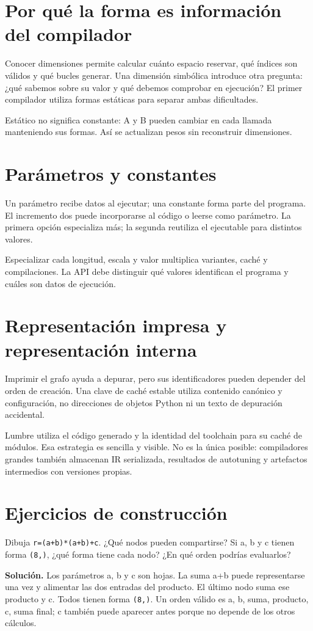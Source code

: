 \documentclass[12pt,a4paper,oneside]{report}
\begin{document}
\section{Por qué la forma es información del compilador}
Conocer dimensiones permite calcular cuánto espacio reservar, qué índices son válidos y qué bucles generar. Una dimensión simbólica introduce otra pregunta: ¿qué sabemos sobre su valor y qué debemos comprobar en ejecución? El primer compilador utiliza formas estáticas para separar ambas dificultades.

Estático no significa constante: A y B pueden cambiar en cada llamada manteniendo sus formas. Así se actualizan pesos sin reconstruir dimensiones.

\section{Parámetros y constantes}
Un parámetro recibe datos al ejecutar; una constante forma parte del programa. El incremento dos puede incorporarse al código o leerse como parámetro. La primera opción especializa más; la segunda reutiliza el ejecutable para distintos valores.

Especializar cada longitud, escala y valor multiplica variantes, caché y compilaciones. La API debe distinguir qué valores identifican el programa y cuáles son datos de ejecución.

\section{Representación impresa y representación interna}
Imprimir el grafo ayuda a depurar, pero sus identificadores pueden depender del orden de creación. Una clave de caché estable utiliza contenido canónico y configuración, no direcciones de objetos Python ni un texto de depuración accidental.

Lumbre utiliza el código generado y la identidad del toolchain para su caché de módulos. Esa estrategia es sencilla y visible. No es la única posible: compiladores grandes también almacenan IR serializada, resultados de autotuning y artefactos intermedios con versiones propias.

\section{Ejercicios de construcción}
\begin{practica}
Dibuja \texttt{r=(a+b)*(a+b)+c}. ¿Qué nodos pueden compartirse? Si a, b y c tienen forma \texttt{(8,)}, ¿qué forma tiene cada nodo? ¿En qué orden podrías evaluarlos?

\end{practica}
\textbf{Solución.} Los parámetros a, b y c son hojas. La suma a+b puede representarse una vez y alimentar las dos entradas del producto. El último nodo suma ese producto y c. Todos tienen forma \texttt{(8,)}. Un orden válido es a, b, suma, producto, c, suma final; c también puede aparecer antes porque no depende de los otros cálculos.
\end{document}
